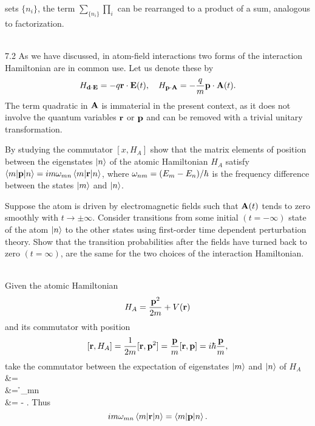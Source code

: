 \documentclass[10pt,letterpaper]{article}
\begin{document}
sets ${\{ n_i\}}$, the term
$\sum_{\{ n_i\}}\prod_i$ can be rearranged to a product of a sum, analogous to factorization. \\ \\
\eenum
\item[7.2]
As we have discussed, in atom-field interactions two forms of the interaction Hamiltonian are in common use.
Let us denote these by
\[
	H_{\mathbf{d}\cdot \mathbf{E}} = -q\mathbf{r}\cdot \mathbf{E}(t),\quad H_{\mathbf{p}\cdot\mathbf{A}} = -\frac{q}{m}\mathbf{p}\cdot\mathbf{A}(t).
\]
The term quadratic in $\mathbf{A}$ is immaterial in the present context, as it does not involve the quantum variables
$\mathbf{r}$ or $\mathbf{p}$ and can be removed with a trivial unitary transformation.
\benum
\item 
By studying the commutator $[x,H_A]$ show that the matrix elements of position between the eigenstates $\ket n$ of
the atomic Hamiltonian $H_A$ satisfy $\braket{m|\mathbf{p}|n} = im\omega_{mn}\braket{m|\mathbf{r}|n}$, where
$\omega_{nm} = (E_m-E_n)/\hbar$ is the frequency difference between the states $\ket m$ and $\ket n$. 
\item
Suppose the atom is driven by electromagnetic fields such that $\mathbf{A}(t)$ tends to zero smoothly with $t\to \pm\infty$.
Consider transitions from some initial $(t=-\infty)$ state of the atom $\ket n$ to the other states using first-order
time dependent perturbation theory. Show that the transition probabilities after the fields have turned back to zero
$(t=\infty)$, are the same for the two choices of the interaction Hamiltonian. \\ \\
\eenum
\benum
\item 
Given the atomic Hamiltonian
\[
	H_A = \frac{\mathbf{p}^2}{2m}+V(\mathbf{r})
\]
and its commutator with position
\[
	[\mathbf{r},H_A] = \frac{1}{2m}[\mathbf{r},\mathbf{p}^2] = \frac{\mathbf{p}}{m}[\mathbf{r},\mathbf{p}] = i\hbar \frac{\mathbf{p}}{m},
\]
take the commutator between the expectation of eigenstates $\ket m$ and $\ket n$ of $H_A$
\ba
	 &= \\
	&= \h\omega_{mn}\\
	&= - .
\ea
Thus
\[
	im\omega_{mn}\braket{m|\mathbf{r}|n} = \braket{m|\mathbf{p}|n}.
\]
\\ \\
\end{document}
